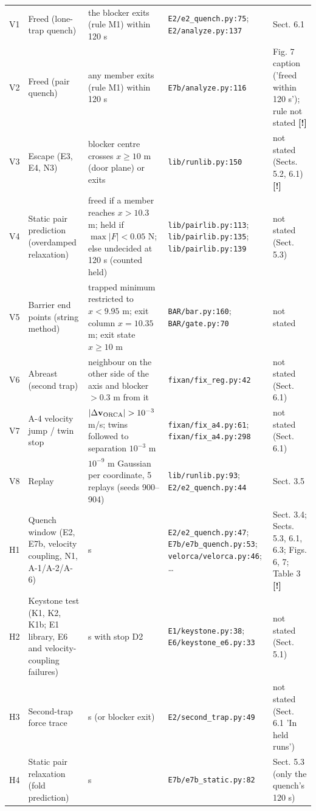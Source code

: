 \begin{tabular}{@{}l>{\raggedright\arraybackslash}p{3.2cm}>{\raggedright\arraybackslash}p{4.6cm}>{\raggedright\arraybackslash}p{3.4cm}>{\raggedright\arraybackslash}p{2.6cm}@{}}
\addlinespace
V1 & Freed (lone-trap quench) & the blocker exits (rule M1) within 120 s & \texttt{E2/e2\_quench.py:75}; \texttt{E2/analyze.py:137} & Sect. 6.1 \\
V2 & Freed (pair quench) & any member exits (rule M1) within 120 s & \texttt{E7b/analyze.py:116} & Fig. 7 caption ('freed within 120 s'); rule not stated \textbf{[!]} \\
V3 & Escape (E3, E4, N3) & blocker centre crosses $x\ge10$ m (door plane) or exits & \texttt{lib/runlib.py:150} & not stated (Sects. 5.2, 6.1) \textbf{[!]} \\
V4 & Static pair prediction (overdamped relaxation) & freed if a member reaches $x>10.3$ m; held if $\max|F|<0.05$ N; else undecided at 120 s (counted held) & \texttt{lib/pairlib.py:113}; \texttt{lib/pairlib.py:135}; \texttt{lib/pairlib.py:139} & not stated (Sect. 5.3) \\
V5 & Barrier end points (string method) & trapped minimum restricted to $x<9.95$ m; exit column $x=10.35$ m; exit state $x\ge10$ m & \texttt{BAR/bar.py:160}; \texttt{BAR/gate.py:70} & not stated \\
V6 & Abreast (second trap) & neighbour on the other side of the axis and blocker $>0.3$ m from it & \texttt{fixan/fix\_reg.py:42} & not stated (Sect. 6.1) \\
V7 & A-4 velocity jump / twin stop & $|\Delta\mathbf v_{\rm ORCA}|>10^{-3}$ m/s; twins followed to separation $10^{-3}$ m & \texttt{fixan/fix\_a4.py:61}; \texttt{fixan/fix\_a4.py:298} & not stated (Sect. 6.1) \\
V8 & Replay & $10^{-9}$ m Gaussian per coordinate, 5 replays (seeds 900--904) & \texttt{lib/runlib.py:93}; \texttt{E2/e2\_quench.py:44} & Sect. 3.5 \\
\addlinespace
H1 & Quench window (E2, E7b, velocity coupling, N1, A-1/A-2/A-6) & 120 s & \texttt{E2/e2\_quench.py:47}; \texttt{E7b/e7b\_quench.py:53}; \texttt{velorca/velorca.py:46}; \ldots & Sect. 3.4; Sects. 5.3, 6.1, 6.3; Figs. 6, 7; Table 3 \textbf{[!]} \\
H2 & Keystone test (K1, K2, K1b; E1 library, E6 and velocity-coupling failures) & 120 s with stop D2 & \texttt{E1/keystone.py:38}; \texttt{E6/keystone\_e6.py:33} & not stated (Sect. 5.1) \\
H3 & Second-trap force trace & 20 s (or blocker exit) & \texttt{E2/second\_trap.py:49} & not stated (Sect. 6.1 'In held runs') \\
H4 & Static pair relaxation (fold prediction) & 120 s & \texttt{E7b/e7b\_static.py:82} & Sect. 5.3 (only the quench's 120 s) \\

\end{tabular}
